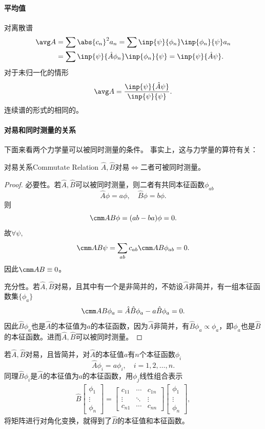 \paragraph{平均值}对离散谱
\begin{align}\notag
	\avg A & =\sum\abs{c_n}^2a_n=\sum\inp{\psi}{\phi_n}\inp{\phi_n}{\psi}a_n  \\
	       & =\sum\inp{\psi}{\hat A \phi_n}\inp{\phi_n}{\psi}=\inp{\psi}{\hat A\psi}.\label{Derivation of Mean Value}
\end{align}
对于未归一化的情形
\[
	\avg A=\frac{\inp{\psi}{\hat A\psi}}{\inp{\psi}{\psi}}.
\]
连续谱的形式的相同的。

\paragraph{对易和同时测量的关系}下面来看两个力学量可以被同时测量的条件。
事实上，这与力学量的算符有关：
\begin{theorem}{对易关系}{Commutate Relation}
	\centering $\hat A,\hat B$对易$\iff$二者可被同时测量。
\end{theorem}
\begin{proof}
	必要性。若$\hat A,\hat B$可以被同时测量，则二者有共同本征函数$\phi_{ab}$
	\[
		\hat A\phi=a\phi,\quad \hat B\phi=b\phi.
	\]
	则
	\[
		\cmm AB\phi=(ab-ba)\phi=0.
	\]
	故$\forall\psi,$
	\[
		\cmm AB\psi=\sum_{ab}c_{ab}\cmm AB\phi_{ab}=0.
	\]
	因此$\cmm AB\equiv 0$。
	
	充分性。若$\hat A,\hat B$对易，且其中有一个是非简并的，不妨设$\hat A$非简并，有一组本征函数集$\{\phi_a\}$
	\[
		\cmm AB\phi_a=\hat A\hat B\phi_a-a\hat B\phi_a=0.
	\]
	因此$\hat B\phi_a$也是$\hat A$的本征值为$a$的本征函数，因为$\hat A$非简并，有$\hat B\phi_a\propto\phi_a$，即$\phi_a$也是$\hat B$的本征函数。进而$\hat A,\hat B$可以被同时测量。
\end{proof}

若$\hat A,\hat B$对易，且皆简并，对$\hat A$的本征值$a$有$n$个本征函数$\phi_i$
\[
	\hat A\phi_i=a\phi_i,\quad i=1,2,\ldots,n.
\]
同理$\hat B\phi_i$是$\hat A$的本征值为$a$的本征函数，用$\phi_j$线性组合表示
\begin{align*}
	\hat B\begin{bmatrix}
		\phi_1 \\\vdots\\\phi_n
	\end{bmatrix}=\begin{bmatrix}
		c_{11} & \cdots & c_{1n} \\
		\vdots & \ddots & \vdots \\
		c_{n1} & \cdots & c_{nn}
	\end{bmatrix}\begin{bmatrix}
		\phi_1 \\\vdots\\\phi_n
	\end{bmatrix},
\end{align*}
将矩阵进行对角化变换，就得到了$\hat B$的本征值和本征函数。
